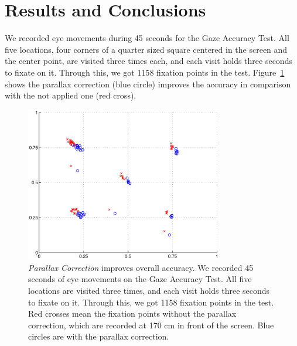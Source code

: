 \documentclass{article}
\begin{document}

\section{Results and Conclusions}

We recorded eye movements during 45 seconds for the Gaze Accuracy Test. All five locations, four corners of a quarter sized square centered in the screen and the center point, are visited three times each, and each visit holds three seconds to fixate on it. Through this, we got 1158 fixation points in the test. Figure~\ref{fig:parallax-correction} shows the parallax correction (blue circle) improves the accuracy in comparison with the not applied one (red cross).

\begin{figure}
  \centerline{\includegraphics[width=86mm,trim=10mm 10mm 10mm 10mm]{./eps/parallax_correction.eps}}
  \caption{\textit{Parallax Correction} improves overall accuracy. We recorded 45 seconds of eye movements on the Gaze Accuracy Test. All five locations are visited three times, and each visit holds three seconds to fixate on it. Through this, we got 1158 fixation points in the test. Red crosses mean the fixation points without the parallax correction, which are recorded at 170 cm in front of the screen. Blue circles are with the parallax correction.}
  \label{fig:parallax-correction}
\end{figure}


\end{document}

